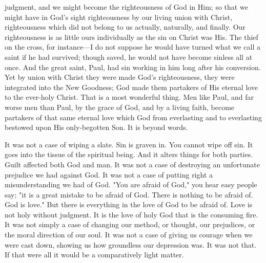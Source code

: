 \documentclass[draft]{ptfdoc}
\begin{document}
judgment, and we might become the righteousness 
of God in Him; so that we might have 
in God's sight righteousness by our living 
union with Christ, righteousness which did 
not belong to us actually, naturally, and 
finally. Our righteousness is as little ours individually 
as the sin on Christ was His. The 
thief on the cross, for instance---I do not suppose 
he would have turned what we call a saint 
if he had survived; though saved, he would 
not have become sinless all at once. And the 
great saint, Paul, had sin working in him long 
after his conversion. Yet by union with Christ 
they were made God's righteousness, they were 
integrated into the New Goodness; God made 
them partakers of His eternal love to the ever-holy 
Christ. That is a most wonderful thing. 
Men like Paul, and far worse men than Paul, 
by the grace of God, and by a living faith, 
become partakers of that same eternal love 
which God from everlasting and to everlasting 
bestowed upon His only-begotten Son. It is 
beyond words. 

It was not a case of wiping a slate. Sin 
is graven in. You cannot wipe off sin. It 
goes into the tissue of the spiritual being. And 
it alters things for both parties. Guilt affected 
both God and man. It was not a case of destroying 
an unfortunate prejudice we had 
against God. It was not a case of putting 
right a misunderstanding we had of God. 
"You are afraid of God," you hear easy people 
say; "it is a great mistake to be afraid of 
God. There is nothing to be afraid of. God is 
love." But there is everything in the love of 
God to be afraid of. Love is not holy without 
judgment. It is the love of holy God that 
is the consuming fire. It was not simply a 
case of changing our method, or thought, our 
prejudices, or the moral direction of our soul. 
It was not a case of giving us courage when we 
were cast down, showing us how groundless 
our depression was. It was not that. If that 
were all it would be a comparatively light 
matter. 
\end{document}
